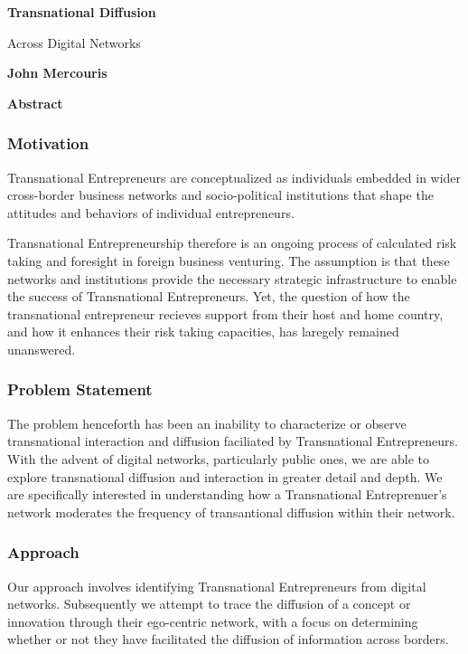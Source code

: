 \thispagestyle{plain}
\begin{center}
    \Large
    \textbf{Transnational Diffusion}
    
    \vspace{0.4cm}
    \large
    Across Digital Networks
    
    \vspace{0.4cm}
    \textbf{John Mercouris}
    
    \vspace{0.9cm}
    \textbf{Abstract}
\end{center}

\subsubsection{Motivation}
Transnational Entrepreneurs are conceptualized as individuals embedded
in wider cross-border business networks and socio-political
institutions that shape the attitudes and behaviors of individual
entrepreneurs.

Transnational Entrepreneurship therefore is an ongoing process of
calculated risk taking and foresight in foreign business
venturing. The assumption is that these networks and institutions
provide the necessary strategic infrastructure to enable the success
of Transnational Entrepreneurs. Yet, the question of how the
transnational entrepreneur recieves support from their host and home
country, and how it enhances their risk taking capacities, has
laregely remained unanswered.

\subsubsection{Problem Statement}
The problem henceforth has been an inability to characterize or
observe transnational interaction and diffusion faciliated by
Transnational Entrepreneurs. With the advent of digital networks,
particularly public ones, we are able to explore transnational
diffusion and interaction in greater detail and depth. We are
specifically interested in understanding how a Transnational
Entreprenuer's network moderates the frequency of transantional
diffusion within their network.

\subsubsection{Approach}
Our approach involves identifying Transnational Entrepreneurs from
digital networks. Subsequently we attempt to trace the diffusion of a
concept or innovation through their ego-centric network, with a focus
on determining whether or not they have facilitated the diffusion of
information across borders.

